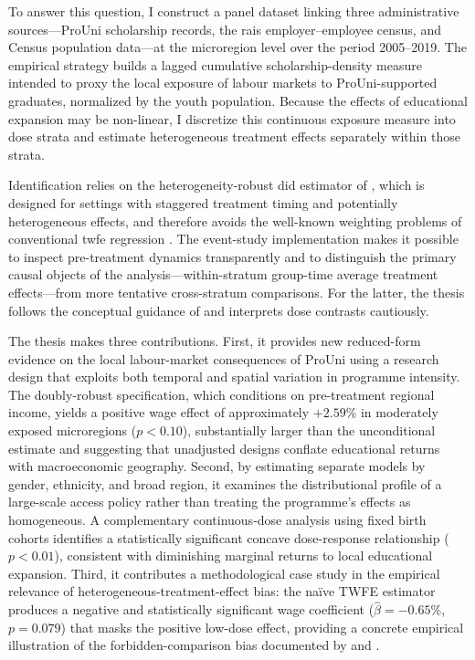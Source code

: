 To answer this question, I construct a panel dataset linking three administrative sources---ProUni scholarship records, the \acrfull{rais} employer--employee census, and Census population data---at the microregion level over the period 2005--2019. The empirical strategy builds a lagged cumulative scholarship-density measure intended to proxy the local exposure of labour markets to ProUni-supported graduates, normalized by the youth population. Because the effects of educational expansion may be non-linear, I discretize this continuous exposure measure into dose strata and estimate heterogeneous treatment effects separately within those strata.

Identification relies on the heterogeneity-robust \acrfull{did} estimator of , which is designed for settings with staggered treatment timing and potentially heterogeneous effects, and therefore avoids the well-known weighting problems of conventional \acrfull{twfe} regression \cite{GoodmanBacon2021, deChaisemartin2020}. The event-study implementation makes it possible to inspect pre-treatment dynamics transparently and to distinguish the primary causal objects of the analysis---within-stratum group-time average treatment effects---from more tentative cross-stratum comparisons. For the latter, the thesis follows the conceptual guidance of  and interprets dose contrasts cautiously.

The thesis makes three contributions. First, it provides new reduced-form evidence on the local labour-market consequences of ProUni using a research design that exploits both temporal and spatial variation in programme intensity. The doubly-robust specification, which conditions on pre-treatment regional income, yields a positive wage effect of approximately $+2.59\%$ in moderately exposed microregions ($p < 0.10$), substantially larger than the unconditional estimate and suggesting that unadjusted designs conflate educational returns with macroeconomic geography. Second, by estimating separate models by gender, ethnicity, and broad region, it examines the distributional profile of a large-scale access policy rather than treating the programme's effects as homogeneous. A complementary continuous-dose analysis using fixed birth cohorts identifies a statistically significant concave dose-response relationship ($p < 0.01$), consistent with diminishing marginal returns to local educational expansion. Third, it contributes a methodological case study in the empirical relevance of heterogeneous-treatment-effect bias: the na\"{i}ve TWFE estimator produces a negative and statistically significant wage coefficient ($\hat{\beta} = -0.65\%$, $p = 0.079$) that masks the positive low-dose effect, providing a concrete empirical illustration of the forbidden-comparison bias documented by  and .

